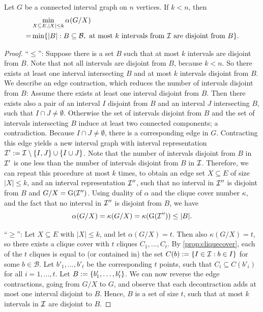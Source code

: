 \begin{lemma}
\label{lemma:contraction}
Let $G$ be a connected interval graph on $n$ vertices. If $k < n$, then
\begin{align*}
&\min_{X \subseteq E, |X| \leq k}\alpha(G/X) \\
= &\min\{ |B| : B \subseteq \mathcal{B}, \text{ at most $k$ intervals from $\mathcal{I}$ are disjoint from $B$} \}.
\end{align*} 
\end{lemma}
\begin{proof}
\enquote{$\leq$}: Suppose there is a set $B$ such that at most $k$ intervals are disjoint from $B$. Note that not all intervals are disjoint from $B$, because $k < n$. So there exists at least one interval intersecting $B$ and at most $k$ intervals disjoint from $B$. We describe an edge contraction, which reduces the number of intervals disjoint from $B$: Assume there exists at least one interval disjoint from $B$. Then there exists also a pair of an interval $I$ disjoint from $B$ and an interval $J$ intersecting $B$, such that $I \cap J \neq \emptyset$. Otherwise the set of  intervals disjoint from $B$ and the set of intervals intersecting $B$ induce at least two connected components; a contradiction. Because $I \cap J \neq \emptyset$, there is a corresponding edge in $G$. Contracting this edge yields a new interval graph with interval representation $\mathcal{I}' := \mathcal{I} \setminus \{ I, J \} \cup \{ I \cup J \}$. Note that the number of intervals disjoint from $B$ in $\mathcal{I}'$ is one less than the number of intervals disjoint from $B$ in $\mathcal{I}$. Therefore, we can repeat this procedure at most $k$ times, to obtain an edge set $X \subseteq E$ of size $|X| \leq k$, and an interval representation $\mathcal{I}''$, such that no interval in $\mathcal{I}''$ is disjoint from $B$ and $G/X = \operatorname{G}(\mathcal{I}'')$. Using duality of $\alpha$ and the clique cover number $\kappa$, and the fact that no interval in $\mathcal{I}''$ is disjoint from $B$, we have
\[\alpha(G/X) = \kappa(G/X) = \kappa(\operatorname{G}(\mathcal{I}'')) \leq |B|.  \]

\enquote{$\geq$}: Let $X \subseteq E$ with $|X| \leq k$, and let $\alpha(G/X) = t$. Then also $\kappa(G/X) = t$, so there exists a clique cover with $t$ cliques $C_1, \dots, C_t$. By \cref{prop:cliquecover}, each of the $t$ cliques is equal to (or contained in) the set $C(b)  := \{ I \in \mathcal{I} : b \in I \}$ for some $b \in \mathcal{B}$. Let $b'_1, \dots, b'_t$ be the corresponding $t$ points, such that $C_i \subseteq C(b'_i)$ for all $i = 1,\dots,t$. Let $B := \{ b'_1, \ldots, b'_t \}$. We can now reverse the edge contractions, going from $G/X$ to $G$, and observe that each decontraction adds at most one interval disjoint to $B$. Hence, $B$ is a set of size $t$, such that at most $k$ intervals in $\mathcal{I}$ are disjoint to $B$.  
\end{proof}

